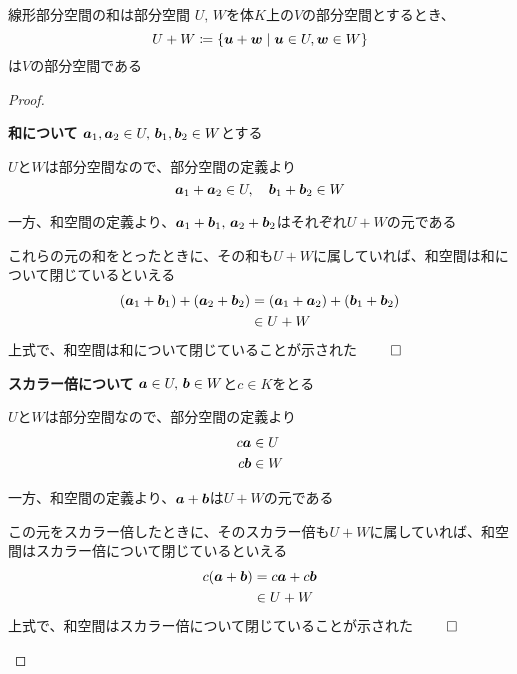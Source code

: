 \documentclass[../../../topic_linear-algebra]{subfiles}
\begin{document}
\begin{theorem}{線形部分空間の和は部分空間}
  $U,\,W$を体$K$上の$V$の部分空間とするとき、
  \begin{equation*}
    U + W \coloneq \{ \vb*{u} + \vb*{w} \mid \vb*{u} \in U, \vb*{w} \in W \}
  \end{equation*}
  は$V$の部分空間である
\end{theorem}

\begin{proof}
  \begin{subpattern}{\bfseries 和について}
    $\vb*{a}_1, \vb*{a}_2 \in U, \, \vb*{b}_1, \vb*{b}_2 \in W$とする

    $U$と$W$は部分空間なので、部分空間の定義より
    \begin{equation*}
      \vb*{a}_1 + \vb*{a}_2 \in U, \quad \vb*{b}_1 + \vb*{b}_2 \in W
    \end{equation*}

    一方、和空間の定義より、$\vb*{a}_1 + \vb*{b}_1,\, \vb*{a}_2 + \vb*{b}_2$はそれぞれ$U+W$の元である

    これらの元の和をとったときに、その和も$U + W$に属していれば、和空間は和について閉じているといえる
    \begin{align*}
      (\vb*{a}_1 + \vb*{b}_1) + (\vb*{a}_2 + \vb*{b}_2) & = (\vb*{a}_1 + \vb*{a}_2) + (\vb*{b}_1 + \vb*{b}_2) \\
                                                        & \in U + W
    \end{align*}
    上式で、和空間は和について閉じていることが示された $\qed$
  \end{subpattern}

  \begin{subpattern}{\bfseries スカラー倍について}
    $\vb*{a} \in U, \, \vb*{b} \in W$と$c \in K$をとる

    $U$と$W$は部分空間なので、部分空間の定義より
    \begin{align*}
      c \vb*{a} & \in U \\
      c \vb*{b} & \in W
    \end{align*}

    一方、和空間の定義より、$\vb*{a} + \vb*{b}$は$U + W$の元である

    この元をスカラー倍したときに、そのスカラー倍も$U + W$に属していれば、和空間はスカラー倍について閉じているといえる
    \begin{align*}
      c(\vb*{a} + \vb*{b}) & = c \vb*{a} + c \vb*{b} \\
                           & \in U + W
    \end{align*}
    上式で、和空間はスカラー倍について閉じていることが示された $\qed$
  \end{subpattern}
\end{proof}
\end{document}
